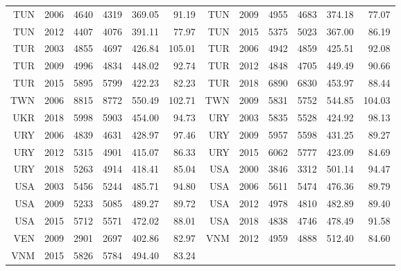 {\begin{longtable}{r|r|r|r|r|r||r|r|r|r|r|r}
    TUN   & 2006  & 4640  & 4319  & 369.05 & 91.19 & TUN   & 2009  & 4955  & 4683  & 374.18 & 77.07 \\
    TUN   & 2012  & 4407  & 4076  & 391.11 & 77.97 & TUN   & 2015  & 5375  & 5023  & 367.00 & 86.19 \\
    TUR   & 2003  & 4855  & 4697  & 426.84 & 105.01 & TUR   & 2006  & 4942  & 4859  & 425.51 & 92.08 \\
    TUR   & 2009  & 4996  & 4834  & 448.02 & 92.74 & TUR   & 2012  & 4848  & 4705  & 449.49 & 90.66 \\
    TUR   & 2015  & 5895  & 5799  & 422.23 & 82.23 & TUR   & 2018  & 6890  & 6830  & 453.97 & 88.44 \\
    TWN   & 2006  & 8815  & 8772  & 550.49 & 102.71 & TWN   & 2009  & 5831  & 5752  & 544.85 & 104.03 \\
    UKR   & 2018  & 5998  & 5903  & 454.00 & 94.73 & URY   & 2003  & 5835  & 5528  & 424.92 & 98.13 \\
    URY   & 2006  & 4839  & 4631  & 428.97 & 97.46 & URY   & 2009  & 5957  & 5598  & 431.25 & 89.27 \\
    URY   & 2012  & 5315  & 4901  & 415.07 & 86.33 & URY   & 2015  & 6062  & 5777  & 423.09 & 84.69 \\
    URY   & 2018  & 5263  & 4914  & 418.41 & 85.04 & USA   & 2000  & 3846  & 3312  & 501.14 & 94.47 \\
    USA   & 2003  & 5456  & 5244  & 485.71 & 94.80 & USA   & 2006  & 5611  & 5474  & 476.36 & 89.79 \\
    USA   & 2009  & 5233  & 5085  & 489.27 & 89.72 & USA   & 2012  & 4978  & 4810  & 482.89 & 89.40 \\
    USA   & 2015  & 5712  & 5571  & 472.02 & 88.01 & USA   & 2018  & 4838  & 4746  & 478.49 & 91.58 \\
    VEN   & 2009  & 2901  & 2697  & 402.86 & 82.97 & VNM   & 2012  & 4959  & 4888  & 512.40 & 84.60 \\
    VNM   & 2015  & 5826  & 5784  & 494.40 & 83.24 & &  &  &  &  &
\end{longtable}%
}